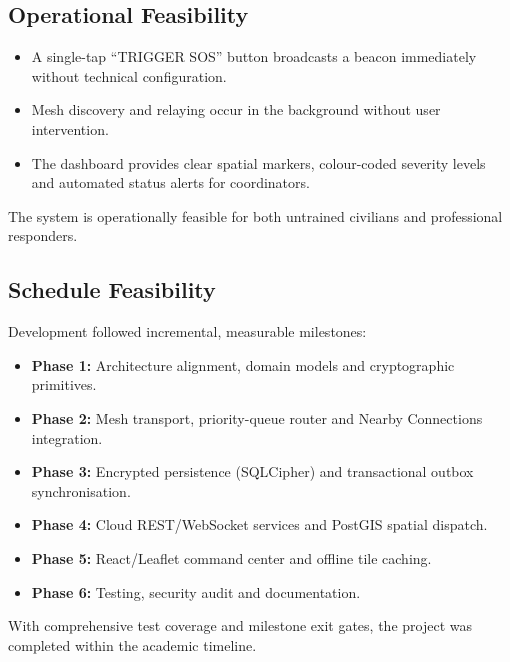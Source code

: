 \documentclass[12pt,a4paper]{report}
\begin{document}
\subsection{Operational Feasibility}
\begin{itemize}
    \item A single-tap ``TRIGGER SOS'' button broadcasts a beacon immediately without technical configuration.
    \item Mesh discovery and relaying occur in the background without user intervention.
    \item The dashboard provides clear spatial markers, colour-coded severity levels and automated status alerts for coordinators.
\end{itemize}
The system is operationally feasible for both untrained civilians and professional responders.

\subsection{Schedule Feasibility}
Development followed incremental, measurable milestones:
\begin{itemize}
    \item \textbf{Phase 1:} Architecture alignment, domain models and cryptographic primitives.
    \item \textbf{Phase 2:} Mesh transport, priority-queue router and Nearby Connections integration.
    \item \textbf{Phase 3:} Encrypted persistence (SQLCipher) and transactional outbox synchronisation.
    \item \textbf{Phase 4:} Cloud REST/WebSocket services and PostGIS spatial dispatch.
    \item \textbf{Phase 5:} React/Leaflet command center and offline tile caching.
    \item \textbf{Phase 6:} Testing, security audit and documentation.
\end{itemize}
With comprehensive test coverage and milestone exit gates, the project was completed within the academic timeline.
\end{document}

